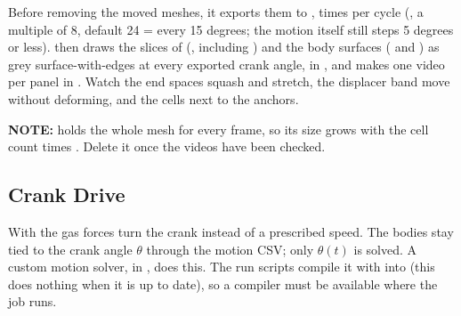 Before removing the moved meshes, it exports them to ,  times per cycle (, a multiple of 8, default 24 = every 15 degrees; the motion itself still steps 5 degrees or less).  then draws the slices of  (\codeword{[SLICE]}, including ) and the body surfaces ( and ) as grey surface-with-edges at every exported crank angle, in , and makes one video per panel in . Watch the end spaces squash and stretch, the displacer band move without deforming, and the cells next to the anchors.

\textbf{NOTE:}  holds the whole mesh for every frame, so its size grows with the cell count times . Delete it once the videos have been checked.

\subsection{Crank Drive}\label{sec:crankDrive}
With  the gas forces turn the crank instead of a prescribed speed. The bodies stay tied to the crank angle $\theta$ through the motion CSV; only $\theta(t)$ is solved. A custom motion solver,  in , does this. The run scripts compile it with  into  (this does nothing when it is up to date), so a compiler must be available where the job runs.

